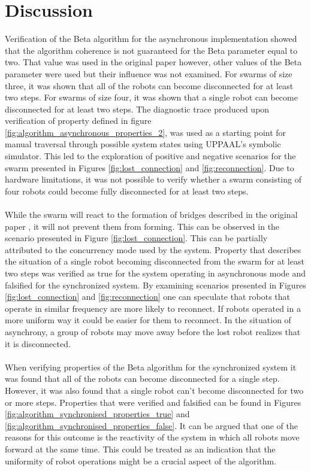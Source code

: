 \section{Discussion}
Verification of the Beta algorithm for the asynchronous implementation showed that the algorithm coherence is not guaranteed for the Beta parameter equal to two. That value was used in the original paper \cite{Nembrini2002} however, other values of the Beta parameter were used but their influence was not examined. For swarms of size three, it was shown that all of the robots can become disconnected for at least two steps. For swarms of size four, it was shown that a single robot can become disconnected for at least two steps. The diagnostic trace produced upon verification of property defined in figure \ref{fig:algorithm_asynchronous_properties_2}, was used as a starting point for manual traversal through possible system states using UPPAAL's symbolic simulator. This led to the exploration of positive and negative scenarios for the swarm presented in Figures \ref{fig:lost_connection} and \ref{fig:reconnection}. Due to hardware limitations, it was not possible to verify whether a swarm consisting of four robots could become fully disconnected for at least two steps.
\\\\
While the swarm will react to the formation of bridges described in the original paper \cite{Nembrini2002}, it will not prevent them from forming. This can be observed in the scenario presented in Figure \ref{fig:lost_connection}. This can be partially attributed to the concurrency mode used by the system. Property that describes the situation of a single robot becoming disconnected from the swarm for at least two steps was verified as true for the system operating in asynchronous mode and falsified for the synchronized system. By examining scenarios presented in Figures \ref{fig:lost_connection} and \ref{fig:reconnection} one can speculate that robots that operate in similar frequency are more likely to reconnect. If robots operated in a more uniform way it could be easier for them to reconnect. In the situation of asynchrony, a group of robots may move away before the lost robot realizes that it is disconnected. 
\\\\
When verifying properties of the Beta algorithm for the synchronized system it was found that all of the robots can become disconnected for a single step. However, it was also found that a single robot can't become disconnected for two or more steps. Properties that were verified and falsified can be found in Figures \ref{fig:algorithm_synchronised_properties_true} and \ref{fig:algorithm_synchronised_properties_false}. It can be argued that one of the reasons for this outcome is the reactivity of the system in which all robots move forward at the same time. This could be treated as an indication that the uniformity of robot operations might be a crucial aspect of the algorithm. 
